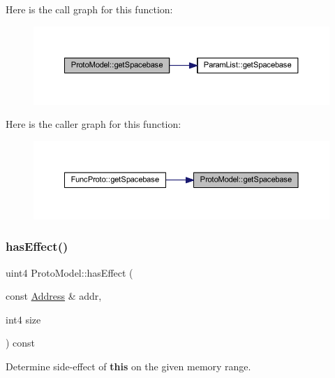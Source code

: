 Here is the call graph for this function\+:
\nopagebreak
\begin{figure}[H]
\begin{center}
\leavevmode
\includegraphics[width=350pt]{class_proto_model_a9918d9e7595d9f33f53bd9ffd3118f19_cgraph}
\end{center}
\end{figure}
Here is the caller graph for this function\+:
\nopagebreak
\begin{figure}[H]
\begin{center}
\leavevmode
\includegraphics[width=350pt]{class_proto_model_a9918d9e7595d9f33f53bd9ffd3118f19_icgraph}
\end{center}
\end{figure}
\mbox{\label{class_proto_model_a5bd9f07bc75fc5f2497f1d4de685a8cf}} 
\subsubsection{\texorpdfstring{hasEffect()}{hasEffect()}}
{\footnotesize\ttfamily uint4 Proto\+Model\+::has\+Effect (\begin{DoxyParamCaption}\item[{const \mbox{\hyperlink{class_address}{Address}} \&}]{addr,  }\item[{int4}]{size }\end{DoxyParamCaption}) const}



Determine side-\/effect of {\bfseries{this}} on the given memory range. 

